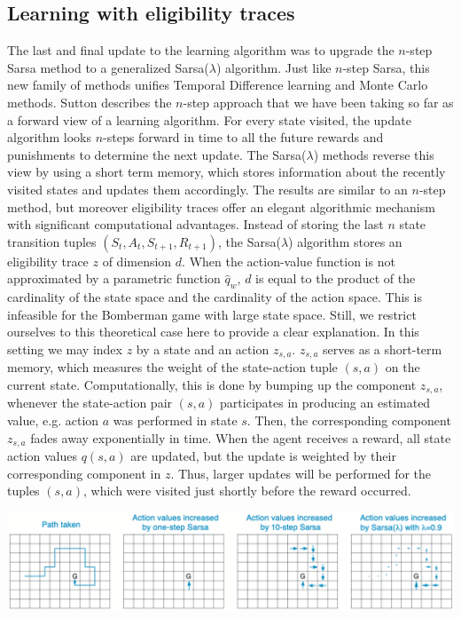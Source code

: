 \subsection{Learning with eligibility traces}

The last and final update to the learning algorithm was to upgrade the $n$-step Sarsa method to a generalized Sarsa($\lambda$) algorithm. Just like $n$-step Sarsa, this new family of methods unifies Temporal Difference learning and Monte Carlo methods. Sutton describes the $n$-step approach that we have been taking so far as a forward view of a learning algorithm. For every state visited, the update algorithm looks $n$-steps forward in time to all the future rewards and punishments to determine the next update. The Sarsa($\lambda$) methods reverse this view by using a short term memory, which stores information about the recently visited states and updates them accordingly. The results are similar to an $n$-step method, but moreover eligibility traces offer an elegant algorithmic mechanism with significant computational advantages. Instead of storing the last $n$ state transition tuples $(S_t, A_t, S_{t+1}, R_{t+1})$, the Sarsa($\lambda$) algorithm stores an eligibility trace $z$ of dimension $d$. When the action-value function is not approximated by a parametric function $\hat q_{w}$, $d$ is equal to the product of the cardinality of the state space and the cardinality of the action space. This is infeasible for the Bomberman game with large state space. Still, we restrict ourselves to this theoretical case here to provide a clear explanation. In this setting we may index $z$ by a state and an action $z_{s, a}$. $z_{s, a}$ serves as a short-term memory, which measures the weight of the state-action tuple $(s, a)$ on the current state. Computationally, this is done by bumping up the component $z_{s, a}$, whenever the state-action pair $(s, a)$ participates in producing an estimated value, e.g. action $a$ was performed in state $s$. Then, the corresponding component $z_{s, a}$ fades away exponentially in time. When the agent receives a reward, all state action values $q(s, a)$ are updated, but the update is weighted by their corresponding component in $z$. Thus, larger updates will be performed for the tuples $(s, a)$, which were visited just shortly before the reward occurred. 

\begin{center}
\includegraphics[scale=0.6]{graphics/sarsa_lambda.png}
\end{center}

